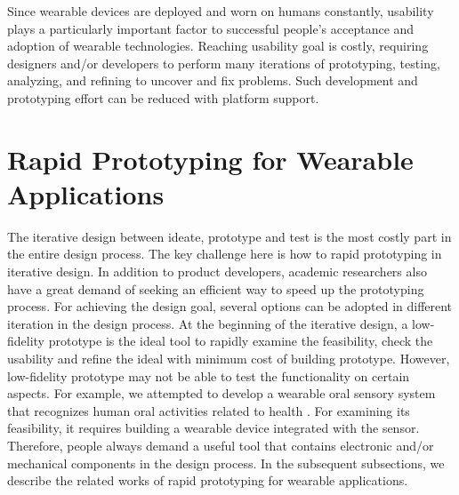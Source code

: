 
Since wearable devices are deployed and worn on humans constantly, usability plays a particularly important factor to successful people's acceptance and adoption of wearable technologies. Reaching usability goal is costly, requiring designers and/or developers to perform many iterations of prototyping, testing, analyzing, and refining to uncover and fix problems. Such development and prototyping effort can be reduced with platform support. 


\section{Rapid Prototyping for Wearable Applications}
The iterative design \cite{Nielsen:1993:IUD:618985.619982, tripp1990rapid, van2007design} between ideate, prototype and test is the most costly part in the entire design process.
The key challenge here is how to rapid prototyping in iterative design. In addition to product developers, academic researchers also have a great demand of seeking an efficient way to speed up the prototyping process. For achieving the design goal, several options can be adopted in different iteration in the design process. At the beginning of the iterative design, a low-fidelity prototype \cite{walker2002high} is the ideal tool to rapidly examine the feasibility, check the usability and refine the ideal with minimum cost of building prototype. However, low-fidelity prototype may not be able to test the functionality on certain aspects. For example, we attempted to develop a wearable oral sensory system that recognizes human oral activities related to health \cite{Li2013teeth}. For examining its feasibility, it requires building a wearable device integrated with the sensor. Therefore, people always demand a useful tool that contains electronic and/or mechanical components in the design process. In the subsequent subsections, we describe the related works of rapid prototyping for wearable applications.



